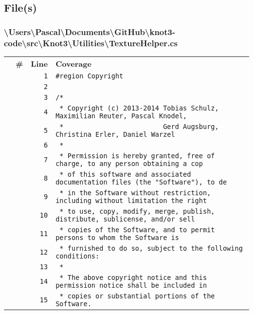 \documentclass[a4paper,10pt]{article}
\begin{document}
\subsection{File(s)}
\subsubsection{\textbackslash Users\textbackslash Pascal\textbackslash Documents\textbackslash GitHub\textbackslash knot3-code\textbackslash src\textbackslash Knot3\textbackslash Utilities\textbackslash TextureHelper.cs}
\begin{longtable}[l]{lrrl}
\textbf{} & \textbf{\#} & \textbf{Line} & \textbf{Coverage}\\
\cellcolor{gray} &  & \verb~1~ & \verb~#region Copyright~\\
\cellcolor{gray} &  & \verb~2~ & \verb~~\\
\cellcolor{gray} &  & \verb~3~ & \verb~/*~\\
\cellcolor{gray} &  & \verb~4~ & \verb~ * Copyright (c) 2013-2014 Tobias Schulz, Maximilian Reuter, Pascal Knodel,~\\
\cellcolor{gray} &  & \verb~5~ & \verb~ *                         Gerd Augsburg, Christina Erler, Daniel Warzel~\\
\cellcolor{gray} &  & \verb~6~ & \verb~ *~\\
\cellcolor{gray} &  & \verb~7~ & \verb~ * Permission is hereby granted, free of charge, to any person obtaining a cop~\\
\cellcolor{gray} &  & \verb~8~ & \verb~ * of this software and associated documentation files (the "Software"), to de~\\
\cellcolor{gray} &  & \verb~9~ & \verb~ * in the Software without restriction, including without limitation the right~\\
\cellcolor{gray} &  & \verb~10~ & \verb~ * to use, copy, modify, merge, publish, distribute, sublicense, and/or sell~\\
\cellcolor{gray} &  & \verb~11~ & \verb~ * copies of the Software, and to permit persons to whom the Software is~\\
\cellcolor{gray} &  & \verb~12~ & \verb~ * furnished to do so, subject to the following conditions:~\\
\cellcolor{gray} &  & \verb~13~ & \verb~ *~\\
\cellcolor{gray} &  & \verb~14~ & \verb~ * The above copyright notice and this permission notice shall be included in ~\\
\cellcolor{gray} &  & \verb~15~ & \verb~ * copies or substantial portions of the Software.~\\

\end{longtable}
\end{document}

